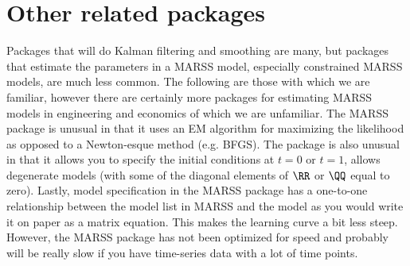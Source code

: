\section{Other related packages}
Packages that will do Kalman filtering and smoothing are many, but packages that estimate the parameters in a MARSS model, especially constrained MARSS models, are much less common.  The following are those with which we are familiar, however there are certainly more packages for estimating MARSS models in engineering and economics of which we are unfamiliar.  The MARSS package is unusual in that it uses an EM algorithm for maximizing the likelihood as opposed to a Newton-esque method (e.g. BFGS). The package is also unusual in that it allows you to specify the initial conditions at $t=0$ or $t=1$, allows degenerate models (with some of the diagonal elements of $\RR$ or $\QQ$ equal to zero). Lastly, model specification in the MARSS package  has a one-to-one relationship between the model list in MARSS and the model as you would write it on paper as a matrix equation.  This makes the learning curve a bit less steep.  However, the MARSS package has not been optimized for speed and probably will be really slow if you have time-series data with a lot of time points.

